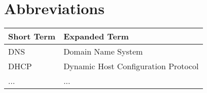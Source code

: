 \chapter{Abbreviations}

\begin{tabular}{p{40mm}|p{100mm}}
	\textbf{Short Term}&\textbf{Expanded Term}\\
	\hline
	DNS&Domain Name System\\
	DHCP&Dynamic Host Configuration Protocol\\
	...&...
\end{tabular}

